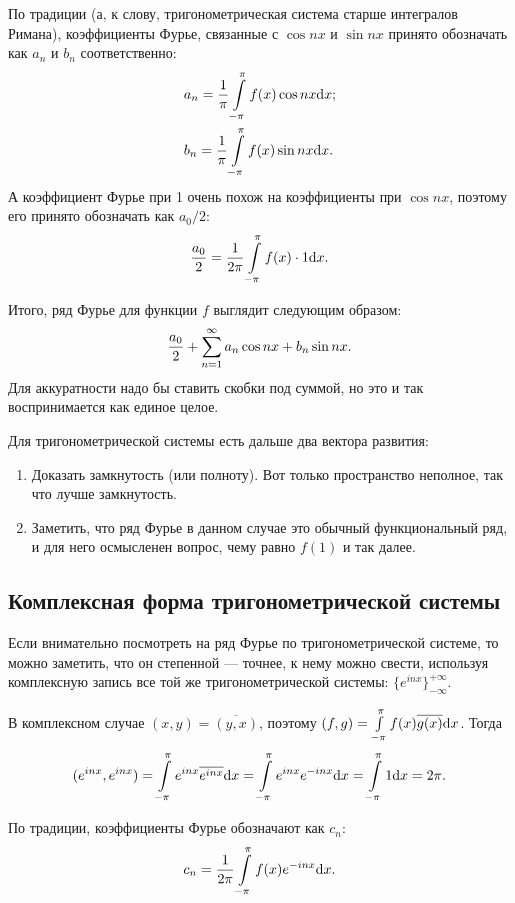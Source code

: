 По традиции (а, к слову, тригонометрическая система старше интегралов Римана), коэффициенты Фурье, связанные с $\cos nx$ и $\sin nx$ принято обозначать как $a_n $ и $b_n$ соответственно:
\begin{align*}
&a_n = \frac{1}{\pi}  \int\limits_{-\pi}^{\pi} f(x) \cos nx \mathrm{d} x;\\
&b_n = \frac1\pi  \int\limits_{-\pi}^{\pi} f(x) \sin nx \mathrm{d} x.
\end{align*}
А коэффициент Фурье при 1 очень похож на коэффициенты при $\cos nx$, поэтому его принято обозначать как $a_0/2$:
$$
\frac{a_0}{2} = \frac{1}{2\pi} \int\limits_{-\pi}^{\pi} f(x) \cdot 1 \mathrm{d} x.
$$

Итого, ряд Фурье для функции $f$ выглядит следующим образом:
$$
\frac{a_0}{2} + \sum\limits_{n=1}^{\infty} a_n \cos nx + b_n \sin nx.
$$
Для аккуратности надо бы ставить скобки под суммой, но это и так воспринимается как единое целое.

Для тригонометрической системы есть дальше два вектора развития:
\begin{enumerate}
\item Доказать замкнутость (или полноту). Вот только пространство неполное, так что лучше замкнутость.
\item Заметить, что ряд Фурье в данном случае это обычный функциональный ряд, и для него осмысленен вопрос, чему равно $f(1)$ и так далее.
\end{enumerate}

\subsection{Комплексная форма тригонометрической системы}
Если внимательно посмотреть на ряд Фурье по тригонометрической системе, то можно заметить, что он степенной --- точнее, к нему можно свести, используя комплексную запись все той же тригонометрической системы: $\{ e^{inx} \}_{-\infty}^{+\infty}$.

В комплексном случае $(x, y) = \overline{(y, x)}$, поэтому $(f, g) =  \int\limits_{-\pi}^{\pi} f(x)\overline{g(x)} \mathrm{d} x$. Тогда
\begin{gather*}
(e^{inx}, e^{inx}) =  \int\limits_{-\pi}^{\pi} e^{inx} \overline{e^{inx}} \mathrm{d} x=  \int\limits_{-\pi}^{\pi} e^{inx} e^{-inx} \mathrm{d} x =  \int\limits_{-\pi}^{\pi} 1 \mathrm{d} x = 2 \pi.
\end{gather*}

По традиции, коэффициенты Фурье обозначают как $c_n$:
$$
c_n = \frac{1}{2\pi}  \int\limits_{-\pi}^{\pi} f(x) e^{-inx} \mathrm{d} x.
$$

